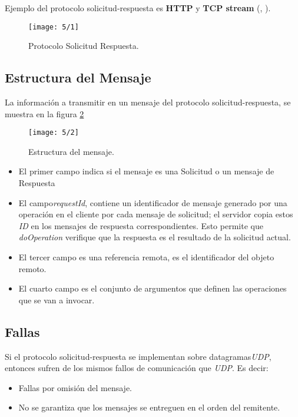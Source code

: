 Ejemplo del protocolo solicitud-respuesta es \textbf{HTTP}  y \textbf{TCP stream} (\cite{Vitillo2021}, \cite{Coulouris2011}).


\begin{figure}%
	\texttt{[image: 5/1]}   %
	\caption{Protocolo Solicitud Respuesta.}
	\label{fig:sol-resp}
\end{figure}

\subsection{Estructura del Mensaje}  

La información a transmitir en un mensaje del protocolo solicitud-respuesta,  se muestra en la figura \ref{fig:est-men}


\begin{figure}%
	\texttt{[image: 5/2]}     %
	\caption{Estructura del mensaje.}
	\label{fig:est-men}
\end{figure}

\begin{itemize}
	\item El primer campo indica si el mensaje es una Solicitud o un mensaje de Respuesta
	\item El campo\textit{requestId}, contiene un identificador de mensaje generado por una  operación en el cliente por cada mensaje de solicitud;  el servidor copia estos \textit{ID} en los mensajes de respuesta correspondientes. Esto permite que \textit{doOperation} verifique que la respuesta es el resultado de la solicitud actual. 
	\item El tercer campo es una referencia remota, es el identificador del objeto remoto.
	\item El cuarto campo es el conjunto de argumentos que definen las operaciones que se van  a invocar.
\end{itemize}


\subsection{Fallas}  

Si el protocolo solicitud-respuesta se implementan sobre datagramas\textit{UDP},  entonces sufren de los mismos fallos de comunicación que \textit{UDP}. Es decir:
\begin{itemize}
	\item Fallas por omisión del mensaje. 
	\item No se garantiza que los mensajes se entreguen en el orden del remitente.
\end{itemize}

